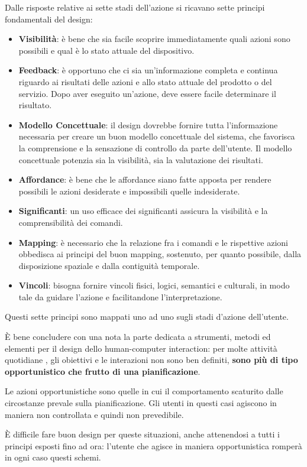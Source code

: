 Dalle risposte relative ai sette stadi dell'azione si ricavano sette principi fondamentali del design:

\begin{itemize}
	\item \textbf{Visibilità}: è bene che sia facile scoprire immediatamente quali azioni sono possibili e qual è lo stato attuale del dispositivo.
	\item \textbf{Feedback}: è opportuno che ci sia un'informazione completa e continua riguardo ai risultati delle azioni e allo stato attuale del prodotto o del servizio. Dopo aver eseguito un'azione, deve essere facile determinare il risultato.
	\item \textbf{Modello Concettuale}: il design dovrebbe fornire tutta l'informazione necessaria per creare un buon modello concettuale del sistema, che favorisca la comprensione e la sensazione di controllo da parte dell'utente. Il modello concettuale potenzia sia la visibilità, sia la valutazione dei risultati.
	\item \textbf{Affordance}: è bene che le affordance siano fatte apposta per rendere possibili le azioni desiderate e impossibili quelle indesiderate.
	\item \textbf{Significanti}: un uso efficace dei significanti assicura la visibilità e la comprensibilità dei comandi.
	\item \textbf{Mapping}: è necessario che la relazione fra i comandi e le rispettive azioni obbedisca ai principi del buon mapping, sostenuto, per quanto possibile, dalla disposizione spaziale e dalla contiguità temporale.
	\item \textbf{Vincoli}: bisogna fornire vincoli fisici, logici, semantici e culturali, in modo tale da guidare l'azione e facilitandone l'interpretazione.
\end{itemize}
Questi sette principi sono mappati uno ad uno sugli stadi d'azione dell'utente.

È bene concludere con una nota la parte dedicata a strumenti, metodi ed elementi per il design dello human-computer interaction: per molte attività quotidiane , gli obiettivi e le interazioni non sono ben definiti, \textbf{sono più di tipo opportunistico che frutto di una pianificazione}.

Le azioni opportunistiche sono quelle in cui il comportamento scaturito dalle circostanze prevale sulla pianificazione. Gli utenti in questi casi agiscono in maniera non controllata e quindi non prevedibile.

È difficile fare buon design per queste situazioni, anche attenendosi a tutti i principi esposti fino ad ora: l'utente che agisce in maniera opportunistica romperà in ogni caso questi schemi.

\pagebreak
